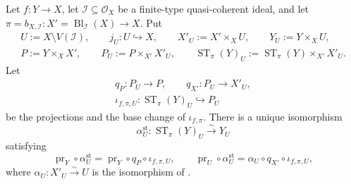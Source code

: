 \begin{lemma}
  \label{lemma:nagata-strict-transform-over-complement}

  Let $f\colon Y\to X$, let
  $\mathcal I\subseteq\mathcal O_X$ be a finite-type quasi-coherent ideal,
  and let
  $\pi=b_{X,\mathcal I}\colon X'=\operatorname{Bl}_{\mathcal I}(X)\to X$.
  Put
  \[
  \begin{gathered}
    U:=X\setminus V(\mathcal I),\qquad
    j_U\colon U\hookrightarrow X,\qquad
    X'_U:=X'\times_XU,\qquad
    Y_U:=Y\times_XU,\\
    P:=Y\times_XX',\qquad
    P_U:=P\times_{X'}X'_U,\qquad
    \operatorname{ST}_\pi(Y)_U
      :=\operatorname{ST}_\pi(Y)\times_{X'}X'_U.
  \end{gathered}
  \]
  Let
  \[
  \begin{gathered}
    q_P\colon P_U\to P,\qquad q_{X'}\colon P_U\to X'_U,\\
    \iota_{f,\pi,U}\colon\operatorname{ST}_\pi(Y)_U\hookrightarrow P_U
  \end{gathered}
  \]
  be the projections and the base change of $\iota_{f,\pi}$.
  There is a unique isomorphism
  \[
    \alpha^{\mathrm{st}}_U\colon
      \operatorname{ST}_\pi(Y)_U\xrightarrow{\sim}Y_U
  \]
  satisfying
  \[
    \operatorname{pr}_Y\circ\alpha^{\mathrm{st}}_U
      =\operatorname{pr}_Y\circ q_P\circ\iota_{f,\pi,U},
    \qquad
    \operatorname{pr}_U\circ\alpha^{\mathrm{st}}_U
      =\alpha_U\circ q_{X'}\circ\iota_{f,\pi,U},
  \]
  where $\alpha_U\colon X'_U\xrightarrow{\sim}U$ is the isomorphism of
  .


\end{lemma}
